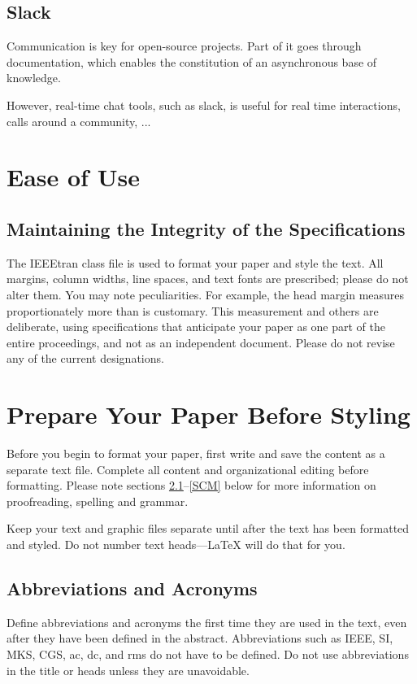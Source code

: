 \documentclass[conference]{IEEEtran}
\begin{document}
\subsection{Slack}

Communication is key for open-source projects. Part of it goes through documentation, which enables the constitution of an asynchronous base of knowledge. 

However, real-time chat tools, such as slack, is useful for real time interactions, calls around a community, ...


\section{Ease of Use}

\subsection{Maintaining the Integrity of the Specifications}

The IEEEtran class file is used to format your paper and style the text. All margins, 
column widths, line spaces, and text fonts are prescribed; please do not 
alter them. You may note peculiarities. For example, the head margin
measures proportionately more than is customary. This measurement 
and others are deliberate, using specifications that anticipate your paper 
as one part of the entire proceedings, and not as an independent document. 
Please do not revise any of the current designations.

\section{Prepare Your Paper Before Styling}
Before you begin to format your paper, first write and save the content as a 
separate text file. Complete all content and organizational editing before 
formatting. Please note sections \ref{AA}--\ref{SCM} below for more information on 
proofreading, spelling and grammar.

Keep your text and graphic files separate until after the text has been 
formatted and styled. Do not number text heads---{\LaTeX} will do that 
for you.

\subsection{Abbreviations and Acronyms}\label{AA}
Define abbreviations and acronyms the first time they are used in the text, 
even after they have been defined in the abstract. Abbreviations such as 
IEEE, SI, MKS, CGS, ac, dc, and rms do not have to be defined. Do not use 
abbreviations in the title or heads unless they are unavoidable.
\end{document}
